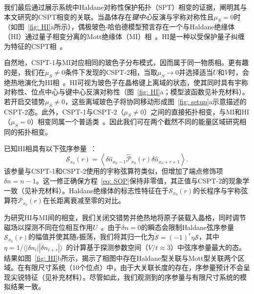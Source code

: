 \documentclass[preprint,superscriptaddress,floatfix,nofootinbib]{revtex4-2}
\begin{document}
我们最后通过展示系统中Haldane对称性保护拓扑（SPT）相变的证据，阐明其与本文研究的CSPT相变的关联。当晶体存在\textit{键中心}反演与宇称对称性且$\mu_S = 0$时（如图~\ref{fig: HI}a所示），偶极玻色-哈伯德模型预言存在一个与Haldane绝缘体（HI）通过量子相变分离的Mott绝缘体（MI）相~\cite{Haldane1983, Buyers1986, Xu1996, Torre2006}。HI是一种以受保护量子纠缠为特征的CSPT相~\cite{Pollmann2012}。

自然地，CSPT-1与MI对应相同的玻色子分布模式，因而属于同一物质相。更有趣的是，我们在$\mu_S \neq 0$条件下发现的CSPT-2相，当取$\mu_S \to 0$并选择适当$U$和$V$时，会绝热地演化为HI相~\cite{Fuji2015}。HI可视为玻色子在晶格键上离域的状态，使其同时具有宇称对称性、位点中心与键中心反演对称性（图~\ref{fig: HI}a；模型波函数见补充材料）。若开启交错势$\mu_S \neq 0$，这些离域玻色子将协同移动形成图~\ref{fig: setup}a示意描述的CSPT-2态。此外，CSPT-1与CSPT-2（$\mu_S \neq 0$）之间的直接拓扑相变，与MI和HI（$\mu_S = 0$）相变同属一个普适类~\cite{Sahay2025}。因此我们可在两个截然不同的能量区域研究相同的拓扑相变。

已知HI相具有以下弦序参量~\cite{Nijs1989, Pollmann2012Detection}：
\begin{equation}
\label{eq: SOP}
\mathcal{S}_{x_0} (r)=\left\langle\delta \hat n_{x_0 -1} \hat{\mathcal{P}}_{x_0}(r)\delta \hat n_{x_0+r + 1}\right\rangle.
\end{equation}
该参量与CSPT-1和CSPT-2使用的宇称弦算符类似，但增加了端点修饰项$\delta n = n - 1$。这一修正确保方程~\eqref{eq: SOP}保持非零值，其正值与CSPT-2的现象学一致（见补充材料）。Haldane绝缘体的标志性特征在于$\mathcal{S}_{x_0}(r)$的长程序与宇称弦算符$\mathcal{P}_{x_0}(r)$在长距离衰减至零的对比。

为研究HI与MI间的相变，我们关闭交错势并绝热地将原子装载入晶格，同时调节磁场以探测不同在位相互作用$U$~\cite{Patscheider2022}。由于$\delta n = 0$的瞬态会限制Haldane弦序参量$\mathcal{S}_{x_0}(r)$的幅值并使其随$r$振荡，我们将其归一化为$\widetilde{\mathcal{S}} = (-1)^{r}\eta \mathcal{S}$，其中$\eta=1/\langle |\delta n_i||\delta n_{i+r}|\rangle$~\cite{Sompet2022}的计算基于探测参数空间（$V/t \approx 3$）中弦序参量最大的态。结果如图~\ref{fig: HI}b所示，揭示了相图中存在Haldane型关联与Mott型关联两个区域。在有限尺寸系统（10个位点）中，由于大关联长度的存在，序参量预计不会呈现尖锐特征（见补充材料）。尽管如此，我们观测到的序参量与有限尺寸系统的模拟结果一致。
\end{document}
